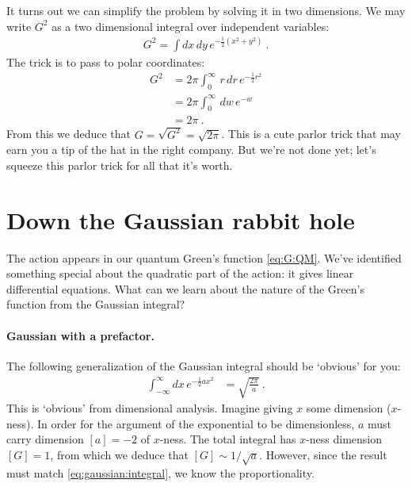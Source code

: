 It turns out we can simplify the problem by solving it in two dimensions. We may write $G^2$ as a two dimensional integral over independent variables:
\begin{align}
	G^2 = \int dx\, dy\, e^{-\frac{1}{2}(x^2 + y^2)} \ .
\end{align}
The trick is to pass to polar coordinates:
\begin{align}
	G^2 &= 2\pi \int_0^\infty\, r\,dr\, e^{-\frac{1}{2}r^2}
	\\
	&= 2\pi \int_0^\infty\, dw\, e^{-w}
	\\
	&= 2\pi \ . \label{eq:gaussian:integral}
\end{align}
From this we deduce that $G = \sqrt{G^2} = \sqrt{2\pi}$. This is a cute parlor trick that may earn you a tip of the hat in the right company. But we're not done yet; let's squeeze this parlor trick for all that it's worth.

\section{Down the Gaussian rabbit hole}

The action appears in our quantum Green's function \eqref{eq:G:QM}. We've identified something special about the quadratic part of the action: it gives linear differential equations. What can we learn about the nature of the Green's function from the Gaussian integral?

\paragraph{Gaussian with a prefactor.} The following generalization of the Gaussian integral should be `obvious' for you:
\begin{align}
	\int_{-\infty}^{\infty}dx\, e^{-\frac{1}{2}ax^2}
	&=
	\sqrt{\frac{2\pi}{a}} \ .
	\label{eq:gaussian:a}
\end{align}
This is `obvious' from dimensional analysis. Imagine giving $x$ some dimension ($x$-ness). In order for the argument of the exponential to be dimensionless, $a$ must carry dimension $[a]=-2$ of $x$-ness. The total integral has $x$-ness dimension $[G]=1$, from which we deduce that $[G]\sim 1/\sqrt{a}$. However, since the result must match \eqref{eq:gaussian:integral}, we know the proportionality.


